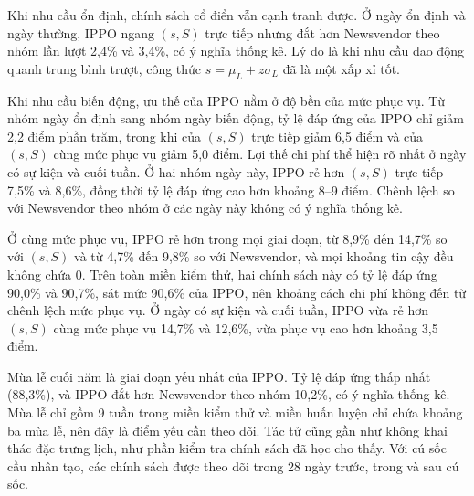 Khi nhu cầu ổn định, chính sách cổ điển vẫn cạnh tranh được. Ở ngày ổn định và ngày thường, IPPO ngang $(s,S)$ trực tiếp nhưng đắt hơn Newsvendor theo nhóm lần lượt 2,4\% và 3,4\%, có ý nghĩa thống kê. Lý do là khi nhu cầu dao động quanh trung bình trượt, công thức $s = \mu_L + z\sigma_L$ đã là một xấp xỉ tốt.

Khi nhu cầu biến động, ưu thế của IPPO nằm ở độ bền của mức phục vụ. Từ nhóm ngày ổn định sang nhóm ngày biến động, tỷ lệ đáp ứng của IPPO chỉ giảm 2,2 điểm phần trăm, trong khi của $(s,S)$ trực tiếp giảm 6,5 điểm và của $(s,S)$ cùng mức phục vụ giảm 5,0 điểm. Lợi thế chi phí thể hiện rõ nhất ở ngày có sự kiện và cuối tuần. Ở hai nhóm ngày này, IPPO rẻ hơn $(s,S)$ trực tiếp 7,5\% và 8,6\%, đồng thời tỷ lệ đáp ứng cao hơn khoảng 8--9 điểm. Chênh lệch so với Newsvendor theo nhóm ở các ngày này không có ý nghĩa thống kê.

Ở cùng mức phục vụ, IPPO rẻ hơn trong mọi giai đoạn, từ 8,9\% đến 14,7\% so với $(s,S)$ và từ 4,7\% đến 9,8\% so với Newsvendor, và mọi khoảng tin cậy đều không chứa 0. Trên toàn miền kiểm thử, hai chính sách này có tỷ lệ đáp ứng 90,0\% và 90,7\%, sát mức 90,6\% của IPPO, nên khoảng cách chi phí không đến từ chênh lệch mức phục vụ. Ở ngày có sự kiện và cuối tuần, IPPO vừa rẻ hơn $(s,S)$ cùng mức phục vụ 14,7\% và 12,6\%, vừa phục vụ cao hơn khoảng 3,5 điểm.

Mùa lễ cuối năm là giai đoạn yếu nhất của IPPO. Tỷ lệ đáp ứng thấp nhất (88,3\%), và IPPO đắt hơn Newsvendor theo nhóm 10,2\%, có ý nghĩa thống kê. Mùa lễ chỉ gồm 9 tuần trong miền kiểm thử và miền huấn luyện chỉ chứa khoảng ba mùa lễ, nên đây là điểm yếu cần theo dõi. Tác tử cũng gần như không khai thác đặc trưng lịch, như phần kiểm tra chính sách đã học cho thấy. Với cú sốc cầu nhân tạo, các chính sách được theo dõi trong 28 ngày trước, trong và sau cú sốc.

